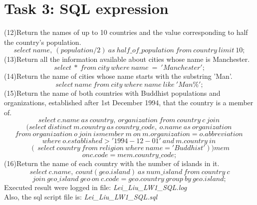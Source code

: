 \documentclass[10pt]{article}
\begin{document}
\section{Task 3: SQL expression}
(12)Return the names of up to 10 countries and the value corresponding to half the country’s population.$$select \ name, \ (population/2) \  as \ half\_of\_population \ 
from \ country \ limit \ 10;$$
(13)Return all the information available about cities whose name is Manchester.$$select \ * \ from \ city \ where \ name\ =\ 'Manchester';$$
(14)Return the name of cities whose name starts with the substring 'Man’.$$select \ name \ from \ city \ where \ name \ like \ 'Man\%';$$
(15)Return the name of both countries with Buddhist populations and organizations, established after 1st December 1994, that the country is a member of.
$$select \ c.name \ as \ country, \  organization \ from \ country \ c \ join \ $$ $$(select \ distinct \ m.country \ as \ country\_code, \ o.name \ as \ organization \ 	$$$$from \ organization \ o \ join \ ismember \ m \ on \ m.organization=o.abbreviation \ $$ $$where \ o.established > '1994-12-01' \ and \ m.country \ in \ $$ $$( \ select \ country \ from \ religion \ where \ name='Buddhist' ) ) mem $$ $$on c.code = mem.country\_code;$$
(16)Return the name of each country with the number of islands in it.
$$select \ c.name, \ count(geo.island) \ as \ num\_island \ from \ country \ c $$$$ join \ geo\_island \ geo \ on \ c.code=geo.country \ group \ by \ geo.island;$$
Executed result were logged in file: \textit{Lei\_Liu\_LW1\_SQL.log}\\
Also, the sql script file is: \textit{Lei\_Liu\_LW1\_SQL.sql}
\end{document}
